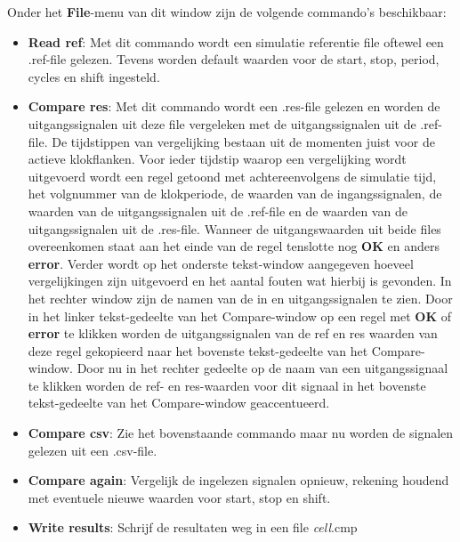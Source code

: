 \begin{itemize}
Onder het {\bf File}-menu van dit window zijn de volgende commando's beschikbaar:
\begin{itemize}
\item {\bf Read ref}: Met dit commando wordt een simulatie referentie file oftewel
                een .ref-file gelezen. 
                Tevens worden default waarden voor de start, stop, period, cycles en shift
                ingesteld.
\item {\bf Compare res}: Met dit commando wordt een .res-file gelezen en worden
               de uitgangssignalen uit deze file vergeleken met de uitgangssignalen
               uit de .ref-file.
               De tijdstippen van vergelijking bestaan uit de momenten juist voor
               de actieve klokflanken.
               Voor ieder tijdstip waarop een vergelijking wordt uitgevoerd
               wordt een regel getoond met achtereenvolgens de simulatie tijd, 
               het volgnummer van de klokperiode, de waarden van de ingangssignalen,
               de waarden van de uitgangssignalen uit de .ref-file en
               de waarden van de uitgangssignalen uit de .res-file.
               Wanneer de uitgangswaarden uit beide files overeenkomen staat aan
               het einde van de regel tenslotte nog {\bf OK} en anders {\bf error}.
	       Verder wordt op het onderste
               tekst-window aangegeven hoeveel vergelijkingen zijn uitgevoerd
               en het aantal fouten wat hierbij is gevonden.
               In het rechter window zijn de namen van de in en uitgangssignalen te zien.
               Door in het linker tekst-gedeelte van het Compare-window op
               een regel met {\bf OK} of {\bf error} te klikken worden de uitgangssignalen
               van de ref en res waarden van deze regel gekopieerd naar het bovenste
               tekst-gedeelte van het Compare-window. 
               Door nu in het rechter gedeelte op de naam van een uitgangssignaal te klikken
               worden de ref- en res-waarden voor dit signaal
               in het bovenste tekst-gedeelte van het Compare-window
               geaccentueerd.
\item {\bf Compare csv}: Zie het bovenstaande commando maar nu worden de signalen gelezen uit
                         een .csv-file.
\item {\bf Compare again}: Vergelijk de ingelezen signalen opnieuw, rekening houdend met eventuele
                           nieuwe waarden voor start, stop en shift.
\item {\bf Write results}: Schrijf de resultaten weg in een file {\it cell}.cmp

\end{itemize}
\end{itemize}
